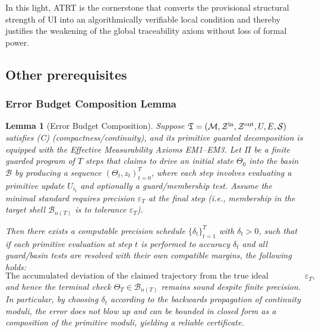 \documentclass[12pt]{article}
\theoremstyle{definition}
\theoremstyle{plain}
\newtheorem{lemma}{Lemma}[section]
\begin{document}
In this light, ATRT is the cornerstone that converts the provisional structural strength of UI into an algorithmically verifiable local condition and thereby justifies the weakening of the global traceability axiom without loss of formal power.



\subsection{Other prerequisites}

\subsubsection{Error Budget Composition Lemma}
\begin{lemma}[Error Budget Composition]
\label{lem:error-budget-full}
Suppose \(\mathfrak T=(\mathcal M,\mathcal Z^{\rm in},\mathcal Z^{\rm out},U,E,\mathcal S)\) satisfies (C) (compactness/continuity), and its primitive guarded decomposition is equipped with the Effective Measurability Axioms EM1–EM3. Let \(\Pi\) be a finite guarded program of \(T\) steps that claims to drive an initial state \(\Theta_0\) into the basin \(\mathcal B\) by producing a sequence \((\Theta_t,z_t)_{t=0}^T\), where each step involves evaluating a primitive update \(U_{i_t}\) and optionally a guard/membership test. Assume the minimal standard requires precision \(\varepsilon_T\) at the final step (i.e., membership in the target shell \(\mathcal B_{n(T)}\) is to tolerance \(\varepsilon_T\)).

Then there exists a computable precision schedule \(\{\delta_t\}_{t=1}^T\) with \(\delta_t>0\), such that if each primitive evaluation at step \(t\) is performed to accuracy \(\delta_t\) and all guard/basin tests are resolved with their own compatible margins, the following holds:
\[
\text{The accumulated deviation of the claimed trajectory from the true ideal trajectory is at most } \varepsilon_T,
\]
and hence the terminal check \(\Theta_T\in\mathcal B_{n(T)}\) remains sound despite finite precision. In particular, by choosing \(\delta_t\) according to the backwards propagation of continuity moduli, the error does not blow up and can be bounded in closed form as a composition of the primitive moduli, yielding a reliable certificate.

\end{lemma}
\end{document}
